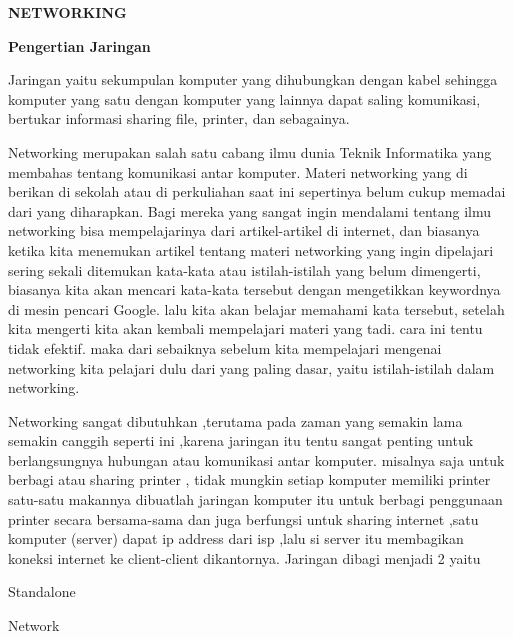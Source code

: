 \documentclass[a4paper,12pt]{report}
\begin{document}
\sloppy
\begin{center}{\fontsize{14pt}{14pt}\selectfont \textbf{NETWORKING} \\}\end{center} \par
\noindent 
\textbf{Pengertian Jaringan} \par
Jaringan yaitu sekumpulan komputer yang dihubungkan dengan kabel sehingga komputer yang satu dengan komputer yang lainnya dapat saling komunikasi, bertukar informasi sharing file, printer, dan sebagainya. \par
\vspace{12pt}
Networking merupakan salah satu cabang ilmu dunia Teknik Informatika yang membahas tentang komunikasi antar komputer. Materi networking yang di berikan di sekolah atau di perkuliahan saat ini sepertinya belum cukup memadai dari yang diharapkan. Bagi mereka yang sangat ingin mendalami tentang ilmu networking bisa mempelajarinya dari artikel-artikel di internet, dan biasanya ketika kita menemukan artikel tentang materi networking yang ingin dipelajari sering sekali ditemukan kata-kata atau istilah-istilah yang belum dimengerti, biasanya kita akan mencari kata-kata tersebut dengan mengetikkan keywordnya di mesin pencari Google. lalu kita akan belajar memahami kata tersebut, setelah kita mengerti kita akan kembali mempelajari materi yang tadi. cara ini tentu tidak efektif. maka dari sebaiknya sebelum kita mempelajari mengenai networking kita pelajari dulu dari yang paling dasar, yaitu istilah-istilah dalam networking. \par
\vspace{12pt}
Networking sangat dibutuhkan ,terutama pada zaman yang semakin lama semakin canggih seperti ini ,karena jaringan itu tentu sangat penting untuk berlangsungnya hubungan atau komunikasi antar komputer. misalnya saja untuk berbagi atau sharing printer , tidak mungkin setiap komputer memiliki printer satu-satu makannya dibuatlah jaringan komputer itu untuk berbagi penggunaan printer secara bersama-sama dan juga berfungsi untuk sharing internet ,satu komputer (server) dapat ip address dari isp ,lalu si server itu membagikan koneksi internet ke client-client dikantornya. Jaringan dibagi menjadi 2 yaitu \par
\noindent 
\begin{myEnumerate}
\item Standalone \par
\noindent 
\item Network\end{myEnumerate}
\end{document}
